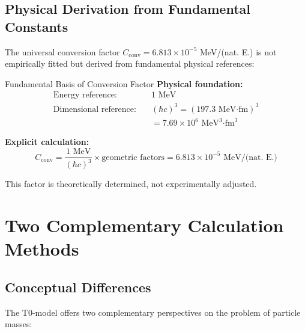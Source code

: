 \documentclass[12pt,a4paper]{article}
\begin{document}
	\subsection{Physical Derivation from Fundamental Constants}
	\label{subsec:physical_derivation}
	
	The universal conversion factor $C_{\text{conv}} = 6.813 \times 10^{-5}$ MeV/(nat. E.) is not empirically fitted but derived from fundamental physical references:
	
	\begin{important}{Fundamental Basis of Conversion Factor}{}
		\textbf{Physical foundation:}
		\begin{align}
			\text{Energy reference:} &\quad 1 \text{ MeV} \\
			\text{Dimensional reference:} &\quad (\hbar c)^3 = (197.3 \text{ MeV·fm})^3 \\
			&\quad = 7.69 \times 10^6 \text{ MeV}^3\text{·fm}^3
		\end{align}
		
		\textbf{Explicit calculation:}
		\begin{equation}
			C_{\text{conv}} = \frac{1 \text{ MeV}}{(\hbar c)^3} \times \text{geometric factors} = 6.813 \times 10^{-5} \text{ MeV/(nat. E.)}
		\end{equation}
		
		This factor is theoretically determined, not experimentally adjusted.
	\end{important}
	
	\section{Two Complementary Calculation Methods}
	\label{sec:two_calculation_methods}
	
	\subsection{Conceptual Differences}
	\label{subsec:conceptual_differences}
	
	The T0-model offers two complementary perspectives on the problem of particle masses:
	
\end{document}
